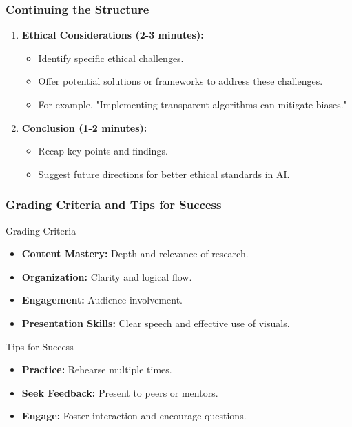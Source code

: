 \documentclass[aspectratio=169]{beamer}
\begin{document}
\begin{frame}[fragile]
    \frametitle{Continuing the Structure}
    \begin{enumerate}[resume]
        \item \textbf{Ethical Considerations (2-3 minutes):}
            \begin{itemize}
                \item Identify specific ethical challenges.
                \item Offer potential solutions or frameworks to address these challenges.
                    \item For example, "Implementing transparent algorithms can mitigate biases."
            \end{itemize}

        \item \textbf{Conclusion (1-2 minutes):}
            \begin{itemize}
                \item Recap key points and findings.
                \item Suggest future directions for better ethical standards in AI.
            \end{itemize}
    \end{enumerate}
\end{frame}

\begin{frame}[fragile]
    \frametitle{Grading Criteria and Tips for Success}
    \begin{block}{Grading Criteria}
        \begin{itemize}
            \item \textbf{Content Mastery:} Depth and relevance of research.
            \item \textbf{Organization:} Clarity and logical flow.
            \item \textbf{Engagement:} Audience involvement.
            \item \textbf{Presentation Skills:} Clear speech and effective use of visuals.
        \end{itemize}
    \end{block}
    \begin{block}{Tips for Success}
        \begin{itemize}
            \item \textbf{Practice:} Rehearse multiple times.
            \item \textbf{Seek Feedback:} Present to peers or mentors.
            \item \textbf{Engage:} Foster interaction and encourage questions.
        \end{itemize}
    \end{block}
\end{frame}
\end{document}
